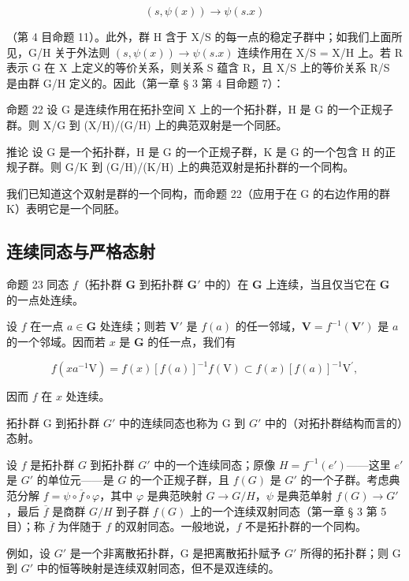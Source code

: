 \[
(s, \psi (x)) \rightarrow \psi (s. x)
\]

（第 4 目命题 11）。此外，群 H 含于 X/S 的每一点的稳定子群中；如我们上面所见，G/H 关于外法则 \((s, \psi(x)) \to \psi(s.x)\) 连续作用在 X/S = X/H 上。若 R 表示 G 在 X 上定义的等价关系，则关系 S 蕴含 R，且 X/S 上的等价关系 R/S 是由群 G/H 定义的。因此（第一章 § 3 第 4 目命题 7）：

命题 22 设 G 是连续作用在拓扑空间 X 上的一个拓扑群，H 是 G 的一个正规子群。则 X/G 到 (X/H)/(G/H) 上的典范双射是一个同胚。

推论 设 G 是一个拓扑群，H 是 G 的一个正规子群，K 是 G 的一个包含 H 的正规子群。则 G/K 到 (G/H)/(K/H) 上的典范双射是拓扑群的一个同构。

我们已知道这个双射是群的一个同构，而命题 22（应用于在 G 的右边作用的群 K）表明它是一个同胚。

\subsection{连续同态与严格态射}

命题 23 同态 \(f\)（拓扑群 \(\mathbf{G}\) 到拓扑群 \(\mathbf{G}'\) 中的）在 \(\mathbf{G}\) 上连续，当且仅当它在 \(\mathbf{G}\) 的一点处连续。

设 \(f\) 在一点 \(a \in \mathbf{G}\) 处连续；则若 \(\mathbf{V}'\) 是 \(f(a)\) 的任一邻域，\(\mathbf{V} = f^{-1}(\mathbf{V}')\) 是 \(a\) 的一个邻域。因而若 \(x\) 是 \(\mathbf{G}\) 的任一点，我们有

\[
f (x a ^ {- 1} \mathrm{V}) = f (x) [ f (a) ] ^ {- 1} f (\mathrm{V}) \subset f (x) [ f (a) ] ^ {- 1} \mathrm{V} ^ {\prime},
\]

因而 \(f\) 在 \(x\) 处连续。

拓扑群 G 到拓扑群 \(G'\) 中的连续同态也称为 G 到 \(G'\) 中的（对拓扑群结构而言的）态射。

设 \(f\) 是拓扑群 \(G\) 到拓扑群 \(G'\) 中的一个连续同态；原像 \(H = f^{-1}(e')\)——这里 \(e'\) 是 \(G'\) 的单位元——是 \(G\) 的一个正规子群，且 \(f(G)\) 是 \(G'\) 的一个子群。考虑典范分解 \(f = \psi \circ \overline{f} \circ \varphi\)，其中 \(\varphi\) 是典范映射 \(G \to G/H\)，\(\psi\) 是典范单射 \(f(G) \to G'\)，最后 \(\overline{f}\) 是商群 \(G/H\) 到子群 \(f(G)\) 上的一个连续双射同态（第一章 § 3 第 5 目）；称 \(\overline{f}\) 为伴随于 \(f\) 的双射同态。一般地说，\(f\) 不是拓扑群的一个同构。

例如，设 \(G'\) 是一个非离散拓扑群，G 是把离散拓扑赋予 \(G'\) 所得的拓扑群；则 G 到 \(G'\) 中的恒等映射是连续双射同态，但不是双连续的。

